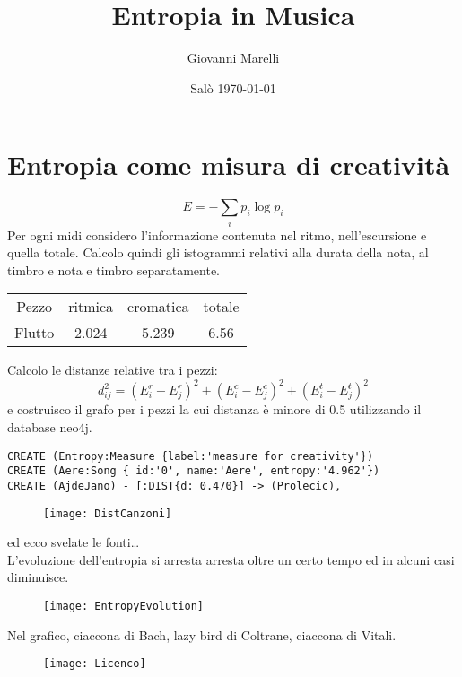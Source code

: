 \documentclass[openany,oneside,notitlepage]{book}
\title{Entropia in Musica}
\author{Giovanni Marelli}
\date{Salò \today}
\begin{document}
\pagestyle{fancy}
\section{Entropia come misura di creatività}
\begin{equation} E = -\sum_i p_i\log p_i \end{equation}
Per ogni midi considero l'informazione contenuta nel ritmo, nell'escursione e quella totale.
Calcolo quindi gli istogrammi relativi alla durata della nota, al timbro e nota e timbro separatamente.
\begin{table}[!h]
\centering
\begin{tabular}{c c c c}
Pezzo & ritmica& cromatica & totale \\
Flutto & 2.024 & 5.239 & 6.56 \\
\end{tabular}
\end{table}
 Calcolo le distanze relative tra i pezzi: \\
 \begin{equation} d_{ij}^2 = (E_i^r-E_j^r)^2 +  (E_i^c-E_j^c)^2 +  (E_i^t-E_j^t)^2 \end{equation}
 e costruisco il grafo per i pezzi la cui distanza è minore di 0.5 utilizzando il database neo4j.\par
\begin{verbatim}
CREATE (Entropy:Measure {label:'measure for creativity'})
CREATE (Aere:Song { id:'0', name:'Aere', entropy:'4.962'})
CREATE (AjdeJano) - [:DIST{d: 0.470}] -> (Prolecic),
\end{verbatim}
\begin{figure}[!h]
\centering
\texttt{[image: DistCanzoni]}
\end{figure}
ed ecco svelate le fonti\ldots\\
L'evoluzione dell'entropia si arresta arresta oltre un certo tempo ed in alcuni casi diminuisce.\par\par
\begin{figure}[!h]
\centering
\texttt{[image: EntropyEvolution]}
\end{figure}
Nel grafico, ciaccona di Bach, lazy bird di Coltrane, ciaccona di Vitali. \par
{}
\begin{figure}[!b]
\texttt{[image: Licenco]}
\end{figure}
\end{document}
